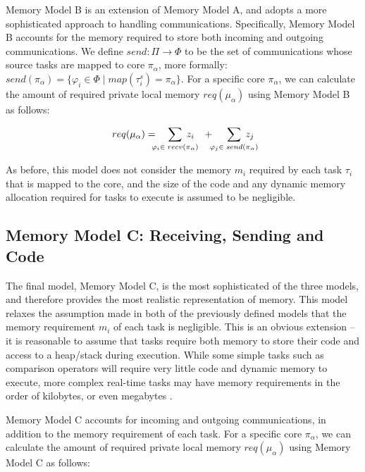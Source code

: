 \documentclass[conference]{IEEEtran}
\begin{document}
Memory Model B is an extension of Memory Model A, and adopts a more sophisticated approach to handling communications. Specifically, Memory Model B accounts for the memory required to store both incoming and outgoing communications. We define $send : \Pi \rightarrow \Phi$ to be the set of communications whose source tasks are mapped to core $\pi_\alpha$, more formally: $send(\pi_\alpha) = \lbrace \varphi_i \in \Phi \mid map(\tau^s_i) = \pi_\alpha \rbrace$. For a specific core $\pi_\alpha$, we can calculate the amount of required private local memory $req(\mu_\alpha)$ using Memory Model B as follows:

	\begin{equation}
		req(\mu_\alpha) =
		\phantom{...} \sum_{\mathclap{\varphi_i \in \phantom{.}recv(\pi_\alpha)}}\phantom{.} z_i
		\phantom{...}+\phantom{....} \sum_{\mathclap{\varphi_j \in \phantom{.}send(\pi_\alpha)}} \phantom{.} z_j
	\end{equation}
	
As before, this model does not consider the memory $m_i$ required by each task $\tau_i$ that is mapped to the core, and the size of the code and any dynamic memory allocation required for tasks to execute is assumed to be negligible.

\subsection{Memory Model C: Receiving, Sending and Code}\label{memory_model_c}

The final model, Memory Model C, is the most sophisticated of the three models, and therefore provides the most realistic representation of memory. This model relaxes the assumption made in both of the previously defined models that the memory requirement $m_i$ of each task is negligible. This is an obvious extension -- it is reasonable to assume that tasks require both memory to store their code and access to a heap/stack during execution. While some simple tasks such as comparison operators will require very little code and dynamic memory to execute, more complex real-time tasks may have memory requirements in the order of kilobytes, or even megabytes \cite{shi2010schedulability}.
	
Memory Model C accounts for incoming and outgoing communications, in addition to the memory requirement of each task. For a specific core $\pi_\alpha$, we can calculate the amount of required private local memory $req(\mu_\alpha)$ using Memory Model C as follows:
\vspace{-1ex}
	
\end{document}
